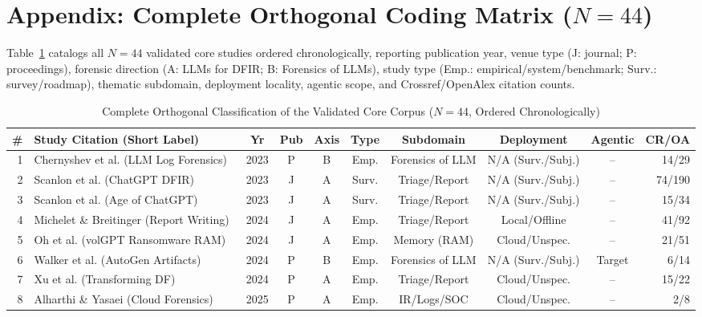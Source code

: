 \appendix
\section*{Appendix: Complete Orthogonal Coding Matrix ($N=44$)}
\label{app:corpus_matrix}
Table~\ref{tab:master_corpus} catalogs all $N=44$ validated core studies ordered chronologically, reporting publication year, venue type (J: journal; P: proceedings), forensic direction (A: LLMs for DFIR; B: Forensics of LLMs), study type (Emp.: empirical/system/benchmark; Surv.: survey/roadmap), thematic subdomain, deployment locality, agentic scope, and Crossref/OpenAlex citation counts.

\begin{table}[!t]
\caption{Complete Orthogonal Classification of the Validated Core Corpus ($N=44$, Ordered Chronologically)}
\label{tab:master_corpus}
\centering
\fontsize{6.3pt}{7.2pt}\selectfont
\setlength{\tabcolsep}{3.2pt}
\begin{tabular}{rlcccccccr}
\toprule
\textbf{\#} & \textbf{Study Citation (Short Label)} & \textbf{Yr} & \textbf{Pub} & \textbf{Axis} & \textbf{Type} & \textbf{Subdomain} & \textbf{Deployment} & \textbf{Agentic} & \textbf{CR/OA} \\
\midrule
1 & Chernyshev et al. (LLM Log Forensics)~\cite{chernyshev2023_towards} & 2023 & P & B & Emp. & Forensics of LLM & N/A (Surv./Subj.) & -- & 14/29 \\
2 & Scanlon et al. (ChatGPT DFIR)~\cite{scanlon2023_chatgpt} & 2023 & J & A & Surv. & Triage/Report & N/A (Surv./Subj.) & -- & 74/190 \\
3 & Scanlon et al. (Age of ChatGPT)~\cite{scanlon2023_digital} & 2023 & J & A & Surv. & Triage/Report & N/A (Surv./Subj.) & -- & 15/34 \\
4 & Michelet \& Breitinger (Report Writing)~\cite{michelet2024_chatgpt} & 2024 & J & A & Emp. & Triage/Report & Local/Offline & -- & 41/92 \\
5 & Oh et al. (volGPT Ransomware RAM)~\cite{oh2024_volgpt} & 2024 & J & A & Emp. & Memory (RAM) & Cloud/Unspec. & -- & 21/51 \\
6 & Walker et al. (AutoGen Artifacts)~\cite{walker2024_forensic} & 2024 & P & B & Emp. & Forensics of LLM & N/A (Surv./Subj.) & Target & 6/14 \\
7 & Xu et al. (Transforming DF)~\cite{xu2024_transforming} & 2024 & P & A & Emp. & Triage/Report & Cloud/Unspec. & -- & 15/22 \\
8 & Alharthi \& Yasaei (Cloud Forensics)~\cite{alharthi2025_llmpowered} & 2025 & P & A & Emp. & IR/Logs/SOC & Cloud/Unspec. & -- & 2/8 \\

\end{tabular}
\end{table}
